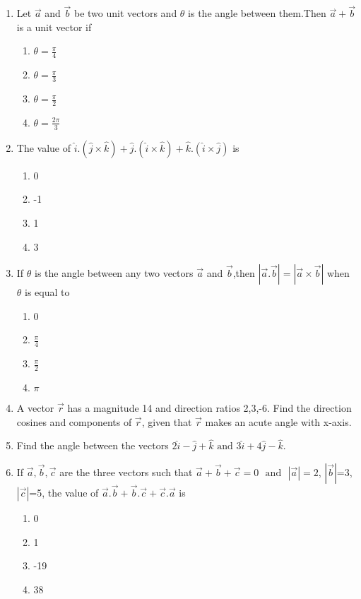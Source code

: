 \begin{enumerate}[label=\thesection.\arabic*,ref=\thesection.\theenumi]
\item Let $\vec{a}$ and $\vec{b}$ be two unit vectors and $\theta$ is the angle between them.Then $\vec{a}+\vec{b}$ is a unit vector if
\begin{enumerate}
\item $\theta=\frac{\pi}{4}$
\item $\theta=\frac{\pi}{3}$
\item $\theta=\frac{\pi}{2}$
\item $\theta=\frac{2\pi}{3}$
\end{enumerate}
\item The value of $\hat{i}.(\hat{j}\times\hat{k})+\hat{j}.(\hat{i}\times\hat{k})+\hat{k}.(\hat{i}\times\hat{j})$ is
\begin{enumerate}
\item 0
\item -1
\item 1
\item 3
\end{enumerate}
\item If $\theta$ is the angle between any two vectors $\vec{a}$ and $\vec{b}$,then $|\vec{a}.\vec{b}|=|\vec{a}\times\vec{b}|$ when $\theta$ is equal to
\begin{enumerate}
\item 0
\item $\frac{\pi}{4}$
\item $\frac{\pi}{2}$
\item $\pi$
\end{enumerate}
\item A vector $\vec{r}$ has a magnitude 14 and direction ratios 2,3,-6. Find the direction cosines and components of $\vec{r}$, given that $\vec{r}$ makes an acute angle with x-axis.
\item Find the angle between the vectors $2\hat{i}-\hat{j}+\hat{k}$ $\text{and}$ $3\hat{i}+4\hat{j}-\hat{k}$.
\item If $\vec{a},\vec{b},\vec{c}$ are the three vectors such that $\vec{a}+\vec{b}+\vec{c}=0$ $\text{ and }$ $|\vec{a}|=2$, $|\vec{b}|$=3, $|\vec{c}|$=5, the value of $\vec{a}.\vec{b}+\vec{b}.\vec{c}+\vec{c}.\vec{a}$ is
	\begin{enumerate}
\item 0
\item 1	
\item -19
\item 38
\end{enumerate}

\end{enumerate}
